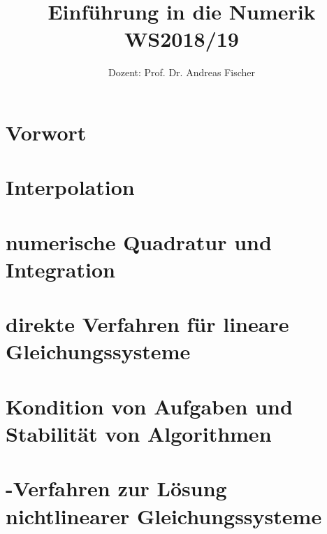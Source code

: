 \documentclass[ngerman,a4paper,order=firstname,sectionreset]{../../texmf/tex/latex/mathscript/mathscript}
\title{\textbf{Einführung in die Numerik WS2018/19}}
\author{Dozent: Prof. Dr. Andreas Fischer}
\begin{document}
\pagestyle{plain}

\maketitle

\hypertarget{tocpage}{}
\tableofcontents
{}

\pagebreak
{}
\pagestyle{fancy}

\chapter*{Vorwort}


\chapter{Interpolation}




\chapter{numerische Quadratur und Integration}






\chapter{direkte Verfahren für lineare Gleichungssysteme}





\chapter{Kondition von Aufgaben und Stabilität von Algorithmen}



\chapter{-Verfahren zur Lösung nichtlinearer Gleichungssysteme}


\end{document}
